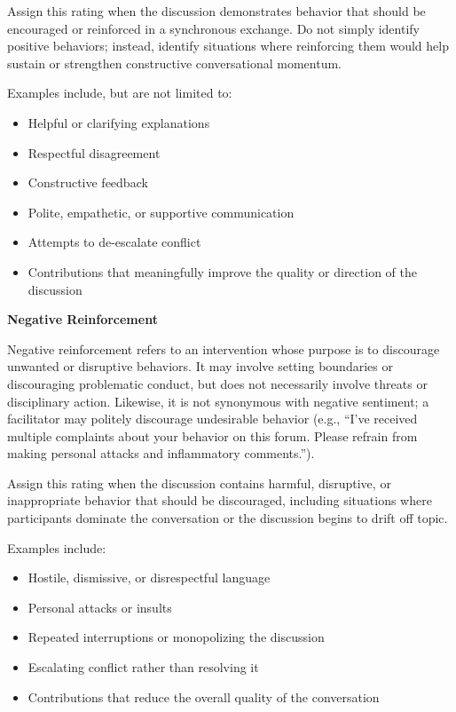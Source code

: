 \documentclass[11pt]{article}
\theoremstyle{definition}
\theoremstyle{plain}
\begin{document}
Assign this rating when the discussion demonstrates behavior that should be encouraged or reinforced in a synchronous exchange. Do not simply identify positive behaviors; instead, identify situations where reinforcing them would help sustain or strengthen constructive conversational momentum.

Examples include, but are not limited to:
\begin{itemize}
	\item Helpful or clarifying explanations
	\item Respectful disagreement
	\item Constructive feedback
	\item Polite, empathetic, or supportive communication
	\item Attempts to de-escalate conflict
	\item Contributions that meaningfully improve the quality or direction of the discussion
\end{itemize}

\textbf{Negative Reinforcement}

Negative reinforcement refers to an intervention whose purpose is to discourage unwanted or disruptive behaviors. It may involve setting boundaries or discouraging problematic conduct, but does not necessarily involve threats or disciplinary action. Likewise, it is not synonymous with negative sentiment; a facilitator may politely discourage undesirable behavior (e.g., ``I've received multiple complaints about your behavior on this forum. Please refrain from making personal attacks and inflammatory comments.'').

Assign this rating when the discussion contains harmful, disruptive, or inappropriate behavior that should be discouraged, including situations where participants dominate the conversation or the discussion begins to drift off topic.

Examples include:
\begin{itemize}
	\item Hostile, dismissive, or disrespectful language
	\item Personal attacks or insults
	\item Repeated interruptions or monopolizing the discussion
	\item Escalating conflict rather than resolving it
	\item Contributions that reduce the overall quality of the conversation
\end{itemize}
\end{document}
